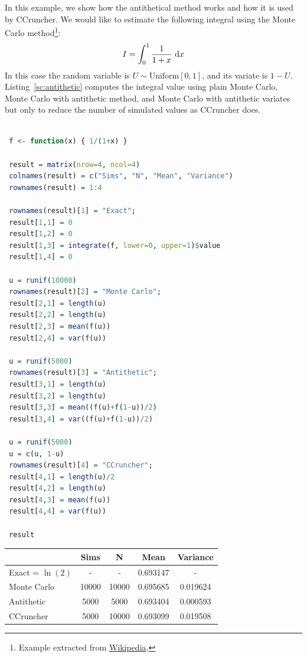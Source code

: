 \documentclass[11pt,fleqn]{book} %
\begin{document}
\begin{example}
	In this example, we show how the antithetical method works and how it 
	is used by CCruncher. We would like to estimate the following integral 
	using the Monte Carlo method\footnote{Example extracted from 
	\href{http://en.wikipedia.org/wiki/Antithetic_variates}{Wikipedia}.}:
	\begin{displaymath}
	I = \displaystyle \int_0^1 \frac{1}{1+x} \mathop{\,\mathrm{{}d}}\mathopen{} x
	\end{displaymath}
	In this case the random variable is $U \sim \text{Uniform}[0,1]$, and 
	its variate is $1-U$. Listing~\ref{sc:antithetic} computes the integral 
	value using plain Monte Carlo, Monte Carlo with antithetic method, and 
	Monte Carlo with antithetic variates but only to reduce the number of 
	simulated values as CCruncher does.

	\begin{lstlisting}[language=R, label=sc:antithetic, caption=Antithetic example (R script)]

 f <- function(x) { 1/(1+x) }
 
 result = matrix(nrow=4, ncol=4)
 colnames(result) = c("Sims", "N", "Mean", "Variance")
 rownames(result) = 1:4

 rownames(result)[1] = "Exact";
 result[1,1] = 0
 result[1,2] = 0
 result[1,3] = integrate(f, lower=0, upper=1)$value
 result[1,4] = 0

 u = runif(10000)
 rownames(result)[2] = "Monte Carlo";
 result[2,1] = length(u)
 result[2,2] = length(u)
 result[2,3] = mean(f(u))
 result[2,4] = var(f(u))

 u = runif(5000)
 rownames(result)[3] = "Antithetic";
 result[3,1] = length(u)
 result[3,2] = length(u)
 result[3,3] = mean((f(u)+f(1-u))/2)
 result[3,4] = var((f(u)+f(1-u))/2)

 u = runif(5000)
 u = c(u, 1-u)
 rownames(result)[4] = "CCruncher";
 result[4,1] = length(u)/2
 result[4,2] = length(u)
 result[4,3] = mean(f(u))
 result[4,4] = var(f(u))
 
 result

	\end{lstlisting}
	\hspace*{1cm}
	\begin{tabular}{l|c|c|c|c|}
		\cline{2-5}
		& Sims & N & Mean & Variance \\
		\hline
		\multicolumn{1}{|l|}{Exact = $\ln(2)$} & - & - & 0.693147 & - \\
		\hline
		\multicolumn{1}{|l|}{Monte Carlo} & 10000 & 10000 & 0.695685 & 0.019624 \\
		\hline
		\multicolumn{1}{|l|}{Antithetic} & 5000 & 5000 & 0.693404 & 0.000593 \\
		\hline
		\multicolumn{1}{|l|}{CCruncher} & 5000 & 10000 & 0.693099 & 0.019508 \\
		\hline
	\end{tabular}
\end{example}
\end{document}
